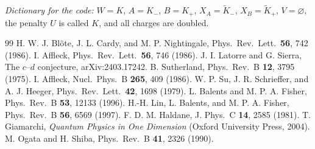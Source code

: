\documentclass[11pt]{article}
\newcommand{\Kt}{\tilde K}
\begin{document}
\medskip
\noindent\emph{Dictionary for the code:} $W=K$, $A=K_-$, $B=K_+$, $X_A=\Kt_-$, $X_B=\Kt_+$, $V=\varnothing$, the penalty $U$ is called $K$, and all charges are doubled.

\begin{thebibliography}{99}\small\setlength\itemsep{0pt}
 H. W. J. Bl\"ote, J. L. Cardy, and M. P. Nightingale, Phys.\ Rev.\ Lett.\ \textbf{56}, 742 (1986).
 I. Affleck, Phys.\ Rev.\ Lett.\ \textbf{56}, 746 (1986).
 J. I. Latorre and G. Sierra, The $c$--$d$ conjecture, arXiv:2403.17242.
 B. Sutherland, Phys.\ Rev.\ B \textbf{12}, 3795 (1975).
 I. Affleck, Nucl.\ Phys.\ B \textbf{265}, 409 (1986).
 W. P. Su, J. R. Schrieffer, and A. J. Heeger, Phys.\ Rev.\ Lett.\ \textbf{42}, 1698 (1979).
 L. Balents and M. P. A. Fisher, Phys.\ Rev.\ B \textbf{53}, 12133 (1996).
 H.-H. Lin, L. Balents, and M. P. A. Fisher, Phys.\ Rev.\ B \textbf{56}, 6569 (1997).
 F. D. M. Haldane, J. Phys.\ C \textbf{14}, 2585 (1981).
 T. Giamarchi, \emph{Quantum Physics in One Dimension} (Oxford University Press, 2004).
 M. Ogata and H. Shiba, Phys.\ Rev.\ B \textbf{41}, 2326 (1990).
\end{thebibliography}
\end{document}
